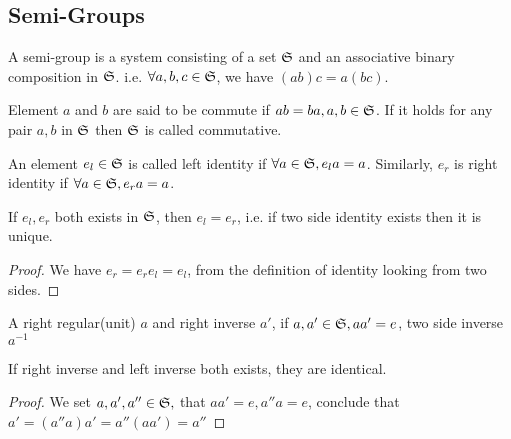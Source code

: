 	\subsection{Semi-Groups}
		\begin{definition}
		A semi-group is a system consisting of a set $\mathfrak{S}$ and an associative binary composition in $\mathfrak{S}$. i.e. $\forall a,b,c \in \mathfrak{S}$, we have $(ab)c=a(bc)$.
		\end{definition}
		\begin{definition}
		Element $a$ and $b$ are said to be commute if $ab=ba, a,b\in\mathfrak{S}$. If it holds for any pair $a,b$ in $\mathfrak{S}$ then $\mathfrak{S}$ is called commutative.
		\end{definition}
		\begin{definition}
		An element $e_l\in\mathfrak{S}$ is called left identity if $\forall a\in\mathfrak{S}, e_la=a$. Similarly, $e_r$ is right identity if $\forall a\in\mathfrak{S}, e_ra=a$.
		\end{definition}
		\begin{theorem}
		If $e_l,e_r$ both exists in $\mathfrak{S}$, then $e_l=e_r$, i.e. if two side identity exists then it is unique.
		\end{theorem}
		\begin{proof}
		We have $e_r=e_re_l=e_l$, from the definition of identity looking from two sides.
		\end{proof}
		\begin{definition}
		A right regular(unit) $a$ and right inverse $a'$, if $a, a'\in\mathfrak{S}, aa'=e$, two side inverse $a^{-1}$
		\end{definition}
		\begin{theorem}
		If right inverse and left inverse both exists, they are identical. 
		\end{theorem}
		\begin{proof}
		We set $a,a',a''\in\mathfrak{S},$ that $aa'=e, a''a=e$, conclude that $a'=(a''a)a'=a''(aa')=a''$
		\end{proof}
